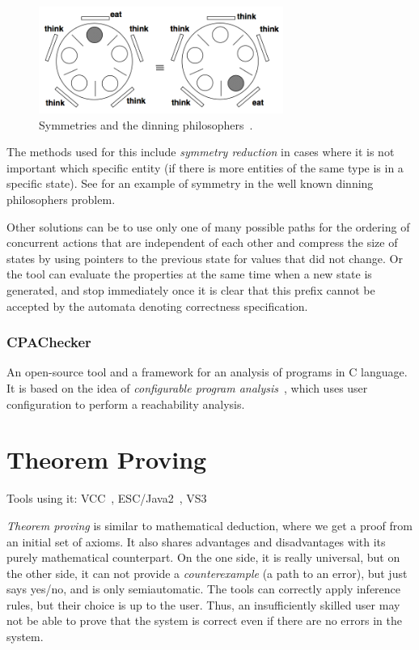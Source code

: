 \begin{figure}
  \centering
 \includegraphics[width=8cm,keepaspectratio]{fig/dinning-symmetry} %
\caption{Symmetries and the dinning philosophers~\cite{KrenaVojnarOverview}.}
\label{fig:fav:dinning}
\end{figure}

The methods used for this include {\em symmetry reduction} in cases where it is not important which specific entity (if there is more entities of the same type is in a specific state). See  for an example of symmetry in the well known dinning philosophers problem.

Other solutions can be to use only one of many possible paths for the ordering of concurrent actions that are independent of each other and compress the size of states by using pointers to the previous state for values that did not change. Or the tool can evaluate the properties at the same time when a new state is generated, and stop immediately once it is clear that this prefix cannot be accepted by the automata denoting correctness specification.


\subsubsection{CPAChecker}

An open-source tool and a framework for an analysis of programs in C language. It is based on the idea of {\em configurable program analysis}~\cite{CPAChecker}, which uses user configuration to perform a reachability analysis.


\section{Theorem Proving}\label{chap:fav:theoremProving}
Tools using it: VCC~\cite{KrenaVojnarOverview}, ESC/Java2~\cite{KrenaVojnarOverview}, VS3~\cite{KrenaVojnarOverview}

{\em Theorem proving} is similar to mathematical deduction, where we get a proof from an initial set of axioms. It also shares advantages and disadvantages with its purely mathematical counterpart. On the one side, it is really universal, but on the other side, it can not provide a {\em counterexample} (a path to an error), but just says yes/no, and is only semiautomatic. The tools can correctly apply inference rules, but their choice is up to the user. Thus, an insufficiently skilled user may not be able to prove that the system is correct even if there are no errors in the system.


